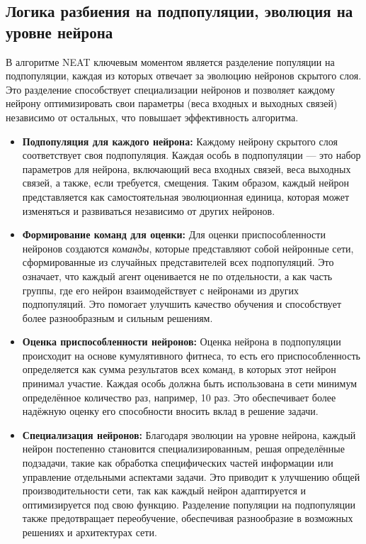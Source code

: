 \documentclass[a4paper,12pt]{article}
\begin{document}
\subsection{Логика разбиения на подпопуляции, эволюция на уровне нейрона}
В алгоритме NEAT ключевым моментом является разделение популяции на подпопуляции, каждая из которых отвечает за эволюцию нейронов скрытого слоя. Это разделение способствует специализации нейронов и позволяет каждому нейрону оптимизировать свои параметры (веса входных и выходных связей) независимо от остальных, что повышает эффективность алгоритма.
\begin{itemize}
\item \textbf{Подпопуляция для каждого нейрона:} Каждому нейрону скрытого слоя соответствует своя подпопуляция. Каждая особь в подпопуляции — это набор параметров для нейрона, включающий веса входных связей, веса выходных связей, а также, если требуется, смещения. Таким образом, каждый нейрон представляется как самостоятельная эволюционная единица, которая может изменяться и развиваться независимо от других нейронов.
	
	\item \textbf{Формирование команд для оценки:} Для оценки приспособленности нейронов создаются \textit{команды}, которые представляют собой нейронные сети, сформированные из случайных представителей всех подпопуляций. Это означает, что каждый агент оценивается не по отдельности, а как часть группы, где его нейрон взаимодействует с нейронами из других подпопуляций. Это помогает улучшить качество обучения и способствует более разнообразным и сильным решениям.
	
	\item \textbf{Оценка приспособленности нейронов:} Оценка нейрона в подпопуляции происходит на основе кумулятивного фитнеса, то есть его приспособленность определяется как сумма результатов всех команд, в которых этот нейрон принимал участие. Каждая особь должна быть использована в сети минимум определённое количество раз, например, 10 раз. Это обеспечивает более надёжную оценку его способности вносить вклад в решение задачи.
	
	\item \textbf{Специализация нейронов:} Благодаря эволюции на уровне нейрона, каждый нейрон постепенно становится специализированным, решая определённые подзадачи, такие как обработка специфических частей информации или управление отдельными аспектами задачи. Это приводит к улучшению общей производительности сети, так как каждый нейрон адаптируется и оптимизируется под свою функцию. Разделение популяции на подпопуляции также предотвращает переобучение, обеспечивая разнообразие в возможных решениях и архитектурах сети.
\end{itemize}
\end{document}
